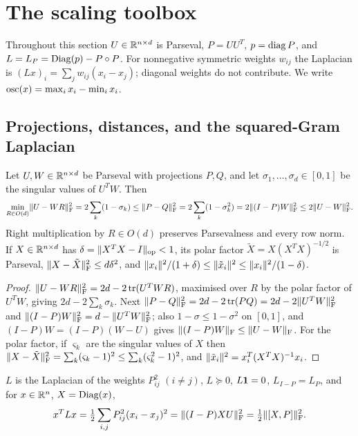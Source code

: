 \section{The scaling toolbox}\label{sec:toolbox}

Throughout this section $U\in\mathbb R^{n\times d}$ is Parseval, $P=UU^T$,
$p=\operatorname{diag} P$, and $L=L_P=\operatorname{Diag}(p)-P\circ P$. For nonnegative symmetric weights
$w_{ij}$ the Laplacian is $(Lx)_i=\sum_jw_{ij}(x_i-x_j)$; diagonal weights do
not contribute. We write $\operatorname{osc}(x)=\max_ix_i-\min_ix_i$.

\subsection{Projections, distances, and the squared-Gram Laplacian}

\begin{lemma}\label{lem:align}
Let $U,W\in\mathbb R^{n\times d}$ be Parseval with projections $P,Q$, and let
$\sigma_1,\dots,\sigma_d\in[0,1]$ be the singular values of $U^TW$. Then
\[
 \min_{R\in O(d)}\lVert U-WR\rVert_{\mathrm F}^2=2\sum_k(1-\sigma_k)\le
 \lVert P-Q\rVert_{\mathrm F}^2=2\sum_k(1-\sigma_k^2)=2\lVert (I-P)W\rVert_{\mathrm F}^2\le2\lVert U-W\rVert_{\mathrm F}^2 .
\]
Right multiplication by $R\in O(d)$ preserves Parsevalness and every row norm.
If $X\in\mathbb R^{n\times d}$ has $\delta=\lVert X^TX-I\rVert_{\mathrm{op}}<1$, its polar factor
$\tilde X=X(X^TX)^{-1/2}$ is Parseval, $\lVert X-\tilde X\rVert_{\mathrm F}^2\le d\delta^2$, and
$\lVert x_i\rVert^2/(1+\delta)\le\lVert \tilde x_i\rVert^2\le\lVert x_i\rVert^2/(1-\delta)$.
\end{lemma}

\begin{proof}
$\lVert U-WR\rVert_{\mathrm F}^2=2d-2\operatorname{tr}(U^TWR)$, maximised over $R$ by the polar factor of $U^TW$,
giving $2d-2\sum_k\sigma_k$. Next $\lVert P-Q\rVert_{\mathrm F}^2=2d-2\operatorname{tr}(PQ)=2d-2\lVert U^TW\rVert_{\mathrm F}^2$
and $\lVert (I-P)W\rVert_{\mathrm F}^2=d-\lVert U^TW\rVert_{\mathrm F}^2$; also $1-\sigma\le1-\sigma^2$ on $[0,1]$,
and $(I-P)W=(I-P)(W-U)$ gives $\lVert (I-P)W\rVert_{\mathrm F}\le\lVert U-W\rVert_{\mathrm F}$. For the polar factor, if $\varsigma_k$ are the singular values of $X$
then $\lVert X-\tilde X\rVert_{\mathrm F}^2=\sum_k(\varsigma_k-1)^2\le\sum_k(\varsigma_k^2-1)^2$, and
$\lVert \tilde x_i\rVert^2=x_i^T(X^TX)^{-1}x_i$.
\end{proof}

\begin{lemma}\label{lem:energy}
$L$ is the Laplacian of the weights $P_{ij}^2$ $(i\ne j)$, $L\succeq0$,
$L\mathbf 1=0$, $L_{I-P}=L_P$, and for $x\in\mathbb R^n$, $X=\operatorname{Diag}(x)$,
\[
 x^TLx=\tfrac12\sum_{i,j}P_{ij}^2(x_i-x_j)^2=\lVert (I-P)XU\rVert_{\mathrm F}^2
 =\tfrac12\lVert [X,P]\rVert_{\mathrm F}^2 .
\]
\end{lemma}

